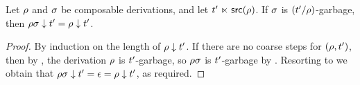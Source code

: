 \begin{lemma}
Let $\rho$ and $\sigma$ be composable derivations, and let $t' \mathrel{\ltimes} \mathsf{src}(\rho)$.
If $\sigma$ is $(t'/\rho)$-garbage, then $\rho\sigma \downarrow t' = \rho \downarrow t'$.
\end{lemma}
\begin{proof}
By induction on the length of $\rho \downarrow t'$.
If there are no coarse steps for $(\rho,t')$,
then by ,
the derivation $\rho$ is $t'$-garbage,
so $\rho\sigma$ is $t'$-garbage by .
Resorting to 
we obtain that $\rho\sigma \downarrow t' = \epsilon = \rho \downarrow t'$,
as required.


\end{proof}
